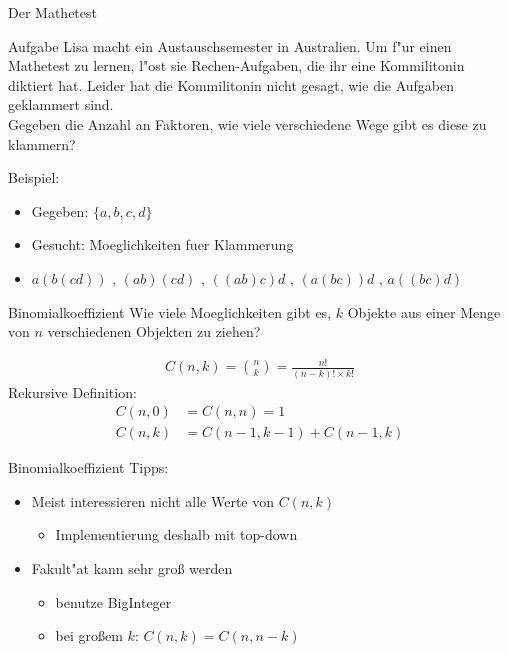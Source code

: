 \documentclass[18pt]{beamer}
\begin{document}
\begin{frame}{Der Mathetest}
\begin{block}{Aufgabe}
Lisa macht ein Austauschsemester in Australien. Um f"ur einen Mathetest zu lernen, l"ost sie Rechen-Aufgaben, die ihr eine Kommilitonin diktiert hat. Leider hat die Kommilitonin nicht gesagt, wie die Aufgaben geklammert sind. \\
Gegeben die Anzahl an Faktoren, wie viele verschiedene Wege gibt es diese zu klammern?
\end{block}
Beispiel:
\begin{itemize}
\item Gegeben: $\lbrace a, b, c, d \rbrace$
\item Gesucht: Moeglichkeiten fuer Klammerung
\item $ a \left( b \left( c d \right) \right) $ , $\left( a b \right) \left( c d \right) $ , $\left( \left( a b \right) c \right) d$ , $\left( a \left( b  c \right) \right) d $ , $ a \left( \left( b  c \right) d \right) $
\end{itemize}
\end{frame}

\begin{frame}{Binomialkoeffizient}
Wie viele Moeglichkeiten gibt es, $k$ Objekte aus einer Menge von $n$ verschiedenen Objekten zu ziehen?

\begin{align*}
C\left( n,k \right) = \binom{n}{k} = \frac{n!}{\left( n-k \right) ! \times k!}
\end{align*}
Rekursive Definition:
\begin{align*}
C\left( n, 0 \right) &= C\left( n,n \right) = 1 \\
C\left( n,k \right) &= C\left( n-1,k-1 \right) + C\left( n-1,k \right)
\end{align*} %

\end{frame}

\begin{frame}{Binomialkoeffizient}
Tipps:
\begin{itemize}
\item Meist interessieren nicht alle Werte von $C \left( n, k \right)$
\begin{itemize}
\item Implementierung deshalb mit top-down
\end{itemize}
\item Fakult"at kann sehr groß werden
\begin{itemize}
\item benutze BigInteger
\item bei großem $k$: $C \left( n, k \right) = C \left( n, n-k \right)$
\end{itemize}
\end{itemize}
\end{frame}
\end{document}
